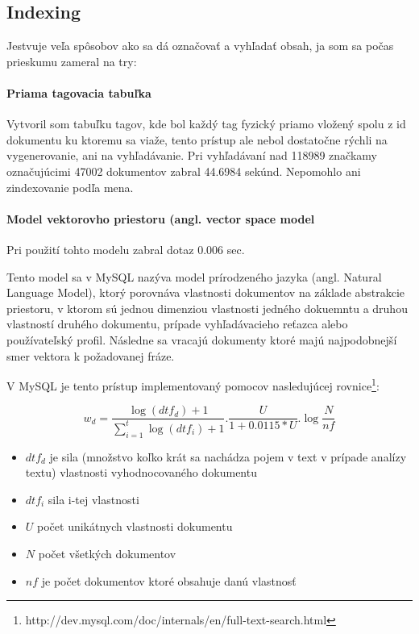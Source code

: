 \subsection{Indexing}

Jestvuje veľa spôsobov ako sa dá označovať a vyhľadať obsah, ja som sa počas prieskumu zameral na try:

\paragraph{Priama tagovacia tabuľka}

Vytvoril som tabuľku tagov, kde bol každý tag fyzický priamo vložený spolu z id dokumentu ku ktoremu sa viaže,
tento prístup ale nebol dostatočne rýchli na vygenerovanie, ani na vyhľadávanie. Pri vyhľadávaní nad 118989 značkamy 
označujúcimi 47002 dokumentov zabral 44.6984 sekúnd. Nepomohlo ani zindexovanie podľa mena.

\paragraph{Model vektorovho priestoru (angl. vector space model}

Pri použití tohto modelu zabral dotaz 0.006 sec.

Tento model sa v MySQL nazýva model prírodzeného jazyka (angl. Natural Language Model),
ktorý porovnáva vlastnosti dokumentov na základe abstrakcie priestoru,
v ktorom sú jednou dimenziou vlastnosti jedného dokuemntu a druhou vlastností druhého
dokumentu, prípade vyhľadávacieho reťazca alebo používateľský profil.
Následne sa vracajú dokumenty ktoré majú najpodobnejší smer vektora k požadovanej fráze.

V MySQL je tento prístup implementovaný pomocov nasledujúcej rovnice\footnote[1]{http://dev.mysql.com/doc/internals/en/full-text-search.html}:

\[
    w_d = \frac{\log(dtf_d) + 1}{\sum_{i=1}^{t} \log (dtf_i) + 1} .
        \frac{U}{1+0.0115 * U} .
        \log \frac {N}{nf}
\]

\begin{itemize}
\item{\(dtf_d\) je sila (množstvo koľko krát sa nachádza pojem v text v prípade analízy textu)
    vlastnosti vyhodnocovaného dokumentu}
\item{\(dtf_i\) sila i-tej vlastnosti}
\item{\(U\) počet unikátnych vlastnosti dokumentu}
\item{\(N\) počet všetkých dokumentov}
\item{\(nf\) je počet dokumentov ktoré obsahuje danú vlastnosť}
\end{itemize}

